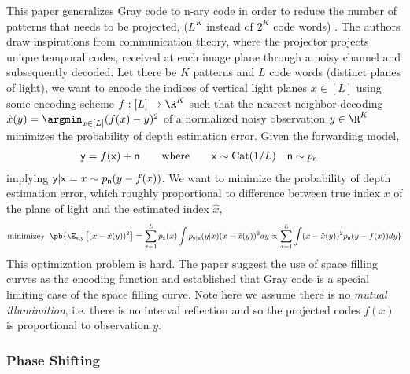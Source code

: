 \documentclass[../writeup.tex]{subfiles}
\begin{document}
This paper generalizes Gray code to n-ary code in order to reduce the number of patterns that needs to be projected, ($L^K$ instead of $2^K$ code words) \cite{hornOptimalStructuredLight1997}. The authors draw inspirations from communication theory, where the projector projects unique temporal codes, received at each image plane through a noisy channel and subsequently decoded. Let there be $K$ patterns and $L$ code words (distinct planes of light), we want to encode the indices of vertical light planes $x\in [L]$ using some encoding scheme $f:[L] \to \R^K$ such that the nearest neighbor decoding $\hat{x}(y) = \argmin_{x\in [L]} ( f(x)-y )^2$ of a normalized noisy observation $y\in\R^K$ minimizes the probability of depth estimation error. Given the forwarding model,
\begin{align*}
    \mathsf{y} = f(\mathsf{x}) + \mathsf{n}
    \quad\quad\text{where}\quad\quad
    \mathsf{x} 
        &\sim \text{Cat}(1/L)
    \quad
    \mathsf{n}
        \sim p_{\mathsf{n}}
\end{align*}
implying $\mathsf{y}|\mathsf{x}=x\sim p_{\mathsf{n}}(y - f(x))$. We want to minimize the probability of depth estimation error, which roughly proportional to difference between true index $x$ of the plane of light and the estimated index $\hat{x}$,
\begin{align*}
    \text{minimize}_{f}\;\; \pb{
        \E_{\rx,\ry} \left[ (x-\hat{x}(y))^2 \right]
        = \sum_{x=1}^L p_{\rx}(x) \int p_{\ry|\rx}(y|x) (x - \hat{x}(y))^2 dy
        \propto \sum_{x=1}^L \int (x-\hat{x}(y))^2 p_{\rn}(y-f(x)) dy
    }
\end{align*}
This optimization problem is hard. The paper suggest the use of space filling curves as the encoding function and established that Gray code is a special limiting case of the space filling curve. Note here we assume there is no \textit{mutual illumination}, i.e. there is no interval reflection and so the projected codes $f(x)$ is proportional to observation $y$. 

\subsubsection{Phase Shifting}
\end{document}
